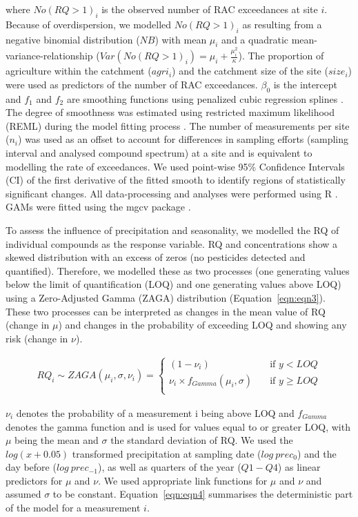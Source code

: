 \documentclass[journal=esthag,manuscript=article]{achemso}
\begin{document}
where $No(RQ > 1)_i$ is the observed number of RAC exceedances at site $i$. 
Because of overdispersion, we modelled $No(RQ > 1)_i$ as resulting from a negative binomial distribution ($NB$) with mean $\mu_i$ and a quadratic mean-variance-relationship ($Var(No(RQ > 1)_i) = \mu_i + \frac{\mu_i^2}{\kappa}$).
The proportion of agriculture within the catchment ($agri_i$) and the catchment size of the site ($size_i$) were used as predictors of the number of RAC exceedances. 
$\beta_0$ is the intercept and $f_1$ and $f_2$ are smoothing functions using penalized cubic regression splines \citep{wood_generalized_2006}. 
The degree of smoothness was estimated using restricted maximum likelihood (REML) during the model fitting process \citep{wood_fast_2011}.
The number of measurements per site ($n_i$) was used as an offset to account for differences in sampling efforts (sampling interval and analysed compound spectrum) at a site and is equivalent to modelling the rate of exceedances. 
We used point-wise 95\% Confidence Intervals (CI) of the first derivative of the fitted smooth to identify regions of statistically significant changes.
All data-processing and analyses were performed using R \citep{r_core_team_r:_2016}.
GAMs were fitted using the mgcv package \citep{wood_fast_2011}.

To assess the influence of precipitation and seasonality, we modelled the RQ of individual compounds as the response variable.
RQ and concentrations show a skewed distribution with an excess of zeros (no pesticides detected and quantified). 
Therefore, we modelled these as two processes (one generating values below the limit of quantification (LOQ) and one generating values above LOQ) using a Zero-Adjusted Gamma (ZAGA) distribution \cite{rigby_generalized_2005,stasinopoulos_gamlss.dist:_2016} (Equation~\ref{eqn:eqn3}).
These two processes can be interpreted as changes in the mean value of RQ (change in $\mu$) and changes in the probability of exceeding LOQ and showing any risk (change in $\nu$).

\begin{align}
RQ_i \sim ZAGA(\mu_i, \sigma, \nu_i) = 
  \begin{cases}
    (1 - \nu_i)   & \quad  \text{if } y < LOQ \\
    \nu_i \times f_{Gamma} (\mu_i, \sigma) & \quad \text{if } y \ge LOQ \\
  \end{cases}
  \label{eqn:eqn3}
\end{align}

$\nu_i$ denotes the probability of a measurement i being above LOQ and $f_{Gamma}$ denotes the gamma function and is used for values equal to or greater LOQ, with $\mu$ being the mean and $\sigma$ the standard deviation of RQ.
We used the $log(x+0.05)$ transformed precipitation at sampling date ($log~prec_0$) and the day before ($log~prec_{-1}$), as well as quarters of the year ($Q1-Q4$) as linear predictors for $\mu$ and $\nu$. 
We used appropriate link functions for $\mu$ and $\nu$ and assumed $\sigma$ to be constant. 
Equation~\ref{eqn:eqn4} summarises the deterministic part of the model for a measurement $i$.
\end{document}
